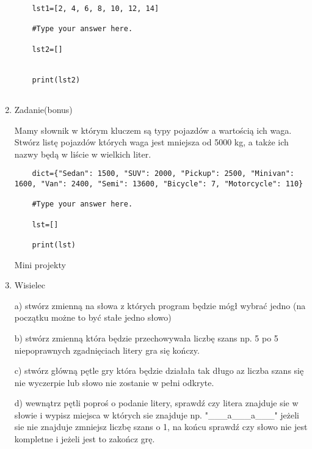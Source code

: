 \documentclass[11pt]{article}
\begin{document}
\begin{enumerate}
\begin{lstlisting}
	lst1=[2, 4, 6, 8, 10, 12, 14]
	
	#Type your answer here.
	
	lst2=[]
	
	
	print(lst2)
	
\end{lstlisting}

\item 
\begin{Large}
	Zadanie(bonus)
\end{Large}
\par
Mamy słownik w którym kluczem są typy pojazdów a wartością ich waga. Stwórz listę pojazdów których waga jest mniejsza od 5000 kg, a także ich nazwy będą w liście w wielkich liter.
\begin{lstlisting}
	dict={"Sedan": 1500, "SUV": 2000, "Pickup": 2500, "Minivan": 1600, "Van": 2400, "Semi": 13600, "Bicycle": 7, "Motorcycle": 110}
	
	#Type your answer here.
	
	lst=[]
	
	print(lst)
\end{lstlisting}

\medskip
\begin{Large}
	Mini projekty
\end{Large}

\item 
\begin{Large}
	Wisielec
\end{Large}
\par
a) stwórz zmienną na słowa z których program będzie mógł wybrać jedno (na początku możne to być stałe jedno słowo)
\par
b) stwórz zmienną która będzie przechowywała liczbę szans np. 5 po 5 niepoprawnych zgadnięciach litery gra się kończy.
\par
c) stwórz główną pętle gry która będzie działała tak długo az liczba szans się nie wyczerpie lub słowo nie zostanie w pełni odkryte.
\par
d) wewnątrz pętli poproś o podanie litery, sprawdź czy litera znajduje sie w słowie i wypisz miejsca w których sie znajduje np. "\_\_\_a\_\_\_a\_\_\_" jeżeli sie nie znajduje zmniejsz liczbę szans o 1, na końcu sprawdź czy słowo nie jest kompletne i jeżeli jest to zakończ grę.


\end{enumerate}
\end{document}
